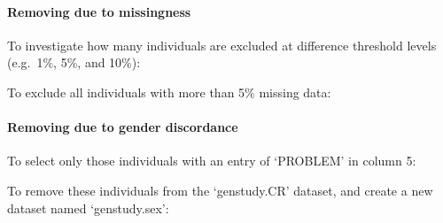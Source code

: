 \documentclass[]{book}
\newenvironment{Shaded}{\begin{snugshade}}{\end{snugshade}}
\newcommand{\KeywordTok}[1]{\textcolor[rgb]{0.13,0.29,0.53}{\textbf{#1}}}
\newcommand{\StringTok}[1]{\textcolor[rgb]{0.31,0.60,0.02}{#1}}
\newcommand{\FunctionTok}[1]{\textcolor[rgb]{0.00,0.00,0.00}{#1}}
\newcommand{\OperatorTok}[1]{\textcolor[rgb]{0.81,0.36,0.00}{\textbf{#1}}}
\newcommand{\ExtensionTok}[1]{#1}
\newcommand{\NormalTok}[1]{#1}
\let\oldparagraph\paragraph
\renewcommand{\paragraph}[1]{\oldparagraph{#1}\mbox{}}
\begin{document}
\paragraph{Removing due to
missingness}\label{removing-due-to-missingness}

To investigate how many individuals are excluded at difference threshold
levels (e.g.~1\%, 5\%, and 10\%):

\begin{Shaded}
\end{Shaded}

To exclude all individuals with more than 5\% missing data:

\begin{Shaded}
\end{Shaded}

\paragraph{Removing due to gender
discordance}\label{removing-due-to-gender-discordance}

To select only those individuals with an entry of `PROBLEM' in column 5:

\begin{Shaded}
\end{Shaded}

To remove these individuals from the `genstudy.CR' dataset, and create a
new dataset named `genstudy.sex':
\end{document}
